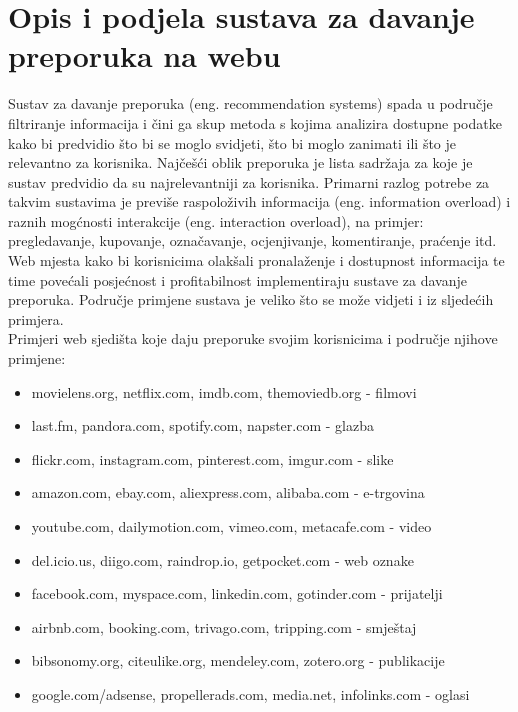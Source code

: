 \documentclass[a4paper,oneside,12pt]{memoir} %
\begin{document}
\chapter{Opis i podjela sustava za davanje preporuka na webu}	
\label{Opis i podjela sustava za davanje preporuka na webu}
Sustav za davanje preporuka (eng. recommendation systems) spada u područje filtriranje informacija i čini ga skup metoda s kojima analizira dostupne podatke kako bi predvidio što bi se moglo svidjeti, što bi moglo zanimati ili što je relevantno za korisnika. Najčešći oblik preporuka je lista sadržaja za koje je sustav predvidio da su najrelevantniji za korisnika. Primarni razlog potrebe za takvim sustavima je previše raspoloživih informacija (eng. information overload) i raznih mogćnosti interakcije (eng. interaction overload), na primjer: pregledavanje, kupovanje, označavanje, ocjenjivanje, komentiranje, praćenje itd. Web mjesta kako bi korisnicima olakšali pronalaženje i dostupnost informacija te time povećali posjećnost i profitabilnost implementiraju sustave za davanje preporuka. Područje primjene sustava je veliko što se može vidjeti i iz sljedećih primjera.
\bigskip
\\ Primjeri web sjedišta koje daju preporuke svojim korisnicima i područje njihove primjene:
\begin{itemize}[topsep=2pt]
\setlength{\parskip}{0pt}
\item movielens.org, netflix.com, imdb.com, themoviedb.org - filmovi
\item last.fm, pandora.com, spotify.com, napster.com - glazba
\item flickr.com, instagram.com, pinterest.com, imgur.com - slike
\item amazon.com, ebay.com, aliexpress.com, alibaba.com - e-trgovina
\item youtube.com, dailymotion.com, vimeo.com, metacafe.com - video
\item del.icio.us, diigo.com, raindrop.io, getpocket.com - web oznake 
\item facebook.com, myspace.com, linkedin.com, gotinder.com - prijatelji
\item airbnb.com, booking.com, trivago.com, tripping.com - smještaj
\item bibsonomy.org, citeulike.org, mendeley.com, zotero.org - publikacije
\item google.com/adsense, propellerads.com, media.net, infolinks.com - oglasi
\end{itemize}
\bigskip
\par
\end{document}
